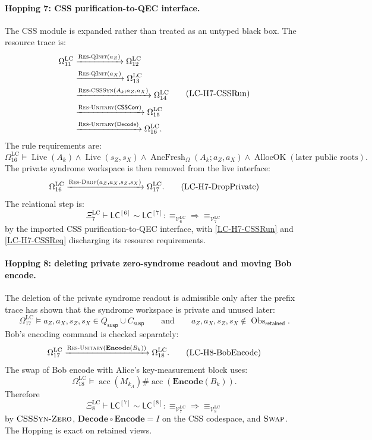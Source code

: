 \documentclass{report}
\theoremstyle{defn_style}
\providecommand{\Live}{\operatorname{Live}}
\providecommand{\AllocOK}{\operatorname{AllocOK}}
\providecommand{\acc}{\operatorname{acc}}
\providecommand{\Obs}{\operatorname{Obs}}
\providecommand{\HopLC}[1]{\mathsf{LC}^{[#1]}}
\begin{document}
\paragraph{Hopping 7: CSS purification-to-QEC interface.}
The CSS module is expanded rather than treated as an untyped black box.  The
resource trace is:
\[
\begin{aligned}
\Omega^{\mathrm{LC}}_{11}
&\xrightarrow{\textsc{Res-QInit}(a_Z)}
\Omega^{\mathrm{LC}}_{12}
\\
&\xrightarrow{\textsc{Res-QInit}(a_X)}
\Omega^{\mathrm{LC}}_{13}
\\
&\xrightarrow{\textsc{Res-CSSSyn}(A_k;a_Z,a_X)}
\Omega^{\mathrm{LC}}_{14}
\\
&\xrightarrow{\textsc{Res-Unitary}(\mathsf{CSSCorr})}
\Omega^{\mathrm{LC}}_{15}
\\
&\xrightarrow{\textsc{Res-Unitary}(\mathsf{Decode})}
\Omega^{\mathrm{LC}}_{16}.
\end{aligned}
\tag{LC-H7-CSSRun}\label{LC-H7-CSSRun}
\]
The rule requirements are:
\[
\Omega^{\mathrm{LC}}_{16}
\models
\Live(A_k)
\land
\Live(s_Z,s_X)
\land
\operatorname{AncFresh}_{\Omega}(A_k;a_Z,a_X)
\land
\AllocOK(\text{later public roots}).
\tag{LC-H7-CSSReq}\label{LC-H7-CSSReq}
\]
The private syndrome workspace is then removed from the live interface:
\[
\Omega^{\mathrm{LC}}_{16}
\xrightarrow{\textsc{Res-Drop}(a_Z,a_X,s_Z,s_X)}
\Omega^{\mathrm{LC}}_{17}.
\tag{LC-H7-DropPrivate}
\]
The relational step is:
\[
\Xi^{\mathrm{LC}}_7
\vdash
\HopLC{6}\sim\HopLC{7}:
\equiv_{\mathcal V^{\mathrm{LC}}_6}
\Longrightarrow
\equiv_{\mathcal V^{\mathrm{LC}}_7}
\tag{LC-H7-Rel}
\]
by the imported CSS purification-to-QEC interface, with
\eqref{LC-H7-CSSRun} and \eqref{LC-H7-CSSReq} discharging its resource
requirements.

\paragraph{Hopping 8: deleting private zero-syndrome readout and moving Bob encode.}
The deletion of the private syndrome readout is admissible only after the prefix
trace has shown that the syndrome workspace is private and unused later:
\[
\Omega^{\mathrm{LC}}_{17}
\models
a_Z,a_X,s_Z,s_X
\in
Q_{\mathsf{susp}}\cup C_{\mathsf{susp}}
\qquad
\text{and}
\qquad
a_Z,a_X,s_Z,s_X\notin \Obs_{\mathsf{retained}}.
\tag{LC-H8-PrivateReq}
\]
Bob's encoding command is checked separately:
\[
\Omega^{\mathrm{LC}}_{17}
\xrightarrow{\textsc{Res-Unitary}(\mathbf{Encode}(B_k))}
\Omega^{\mathrm{LC}}_{18}.
\tag{LC-H8-BobEncode}\label{LC-H8-BobEncode}
\]
The swap of Bob encode with Alice's key-measurement block uses:
\[
\Omega^{\mathrm{LC}}_{18}
\models
\acc(M_{k_A})\#\acc(\mathbf{Encode}(B_k)).
\tag{LC-H8-SwapReq}
\]
Therefore
\[
\Xi^{\mathrm{LC}}_8
\vdash
\HopLC{7}\sim\HopLC{8}:
\equiv_{\mathcal V^{\mathrm{LC}}_7}
\Longrightarrow
\equiv_{\mathcal V^{\mathrm{LC}}_8}
\tag{LC-H8-Rel}
\]
by \(\textsc{CSSSyn-Zero}\), \(\mathbf{Decode}\circ\mathbf{Encode}=I\) on the
CSS codespace, and \(\textsc{Swap}\).  The Hopping is exact on retained views.
\end{document}
